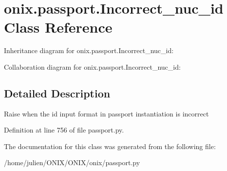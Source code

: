 \hypertarget{classonix_1_1passport_1_1Incorrect__nuc__id}{}\section{onix.\+passport.\+Incorrect\+\_\+nuc\+\_\+id Class Reference}
\label{classonix_1_1passport_1_1Incorrect__nuc__id}


Inheritance diagram for onix.\+passport.\+Incorrect\+\_\+nuc\+\_\+id\+:


Collaboration diagram for onix.\+passport.\+Incorrect\+\_\+nuc\+\_\+id\+:


\subsection{Detailed Description}
\begin{DoxyVerb}Raise when the id input format in passport instantiation is incorrect\end{DoxyVerb}
 

Definition at line 756 of file passport.\+py.



The documentation for this class was generated from the following file\+:\begin{DoxyCompactItemize}
\item 
/home/julien/\+O\+N\+I\+X/\+O\+N\+I\+X/onix/passport.\+py\end{DoxyCompactItemize}

